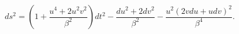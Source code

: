 \begin{equation}
ds^2=\left(1+\frac{u^4+2u^2v^2}{\beta^2}\right)dt^2-\frac{du^2+2
dv^2}{\beta^2}-\frac{u^2(2v du + u dv)^2}{\beta^4}.
\end{equation}

